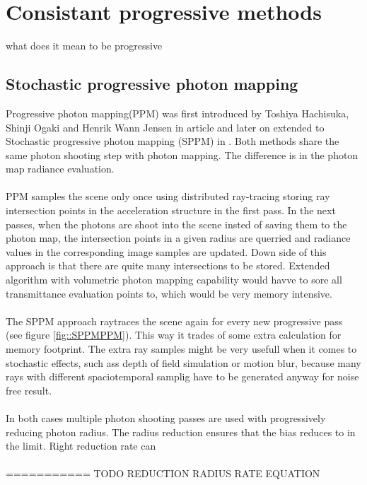 \chapter{Consistant progressive methods}
what does it mean to be progressive
\section{Stochastic progressive photon mapping}
Progressive photon mapping(PPM) was first introduced by Toshiya Hachisuka, Shinji Ogaki and Henrik Wann Jensen in  \cite{Hachisuka:2008:PPM} article and later on extended to Stochastic progressive photon mapping (SPPM) in \cite{Hachisuka:2009:SPP}. Both methods share the same photon shooting step with photon mapping. The difference is in the photon map radiance evaluation.
\\
\\
PPM samples the scene only once using distributed ray-tracing storing ray intersection
points in the acceleration structure in the first pass. In the next passes, when the photons
are shoot into the scene insted of saving them to the photon map, the intersection points
in a given radius are querried and radiance values in the corresponding image samples are
updated. Down side of this approach is that there are quite many intersections to be stored.
Extended algorithm with volumetric photon mapping capability would havve to sore all
transmittance evaluation points to, which would be very memory intensive.
\\
\\
The SPPM approach raytraces the scene again for every new progressive pass (see figure
\ref{fig::SPPMPPM}). This way it trades of some extra calculation for memory footprint. The extra ray
samples might be very usefull when it comes to stochastic effects, such ass depth of field
simulation or motion blur, because many rays with different spaciotemporal samplig have to
be generated anyway for noise free result.
\\
\\
In both cases multiple photon shooting passes are used with progressively reducing photon
radius. The radius reduction ensures that the bias reduces to in the limit. Right
reduction rate can
\\
\\
 =========== TODO REDUCTION RADIUS RATE EQUATION

